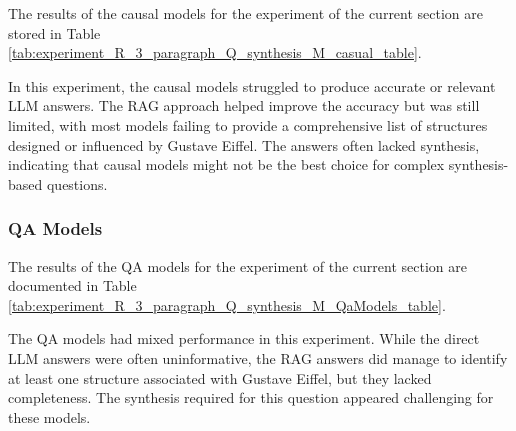 \documentclass{wseas}
\begin{document}
The results of the causal models for the experiment of the current section
are stored in Table \ref{tab:experiment_R_3_paragraph_Q_synthesis_M_casual_table}.

In this experiment, the causal models struggled to produce accurate or
relevant LLM answers. The RAG approach helped improve the accuracy but
was still limited, with most models failing to provide a comprehensive
list of structures designed or influenced by Gustave Eiffel. The answers
often lacked synthesis, indicating that causal models might not be the
best choice for complex synthesis-based questions.


\subsubsection{QA Models}


The results of the QA models for the experiment of the current section
are documented in Table \ref{tab:experiment_R_3_paragraph_Q_synthesis_M_QaModels_table}.

The QA models had mixed performance in this experiment. While the direct
LLM answers were often uninformative, the RAG answers did manage to
identify at least one structure associated with Gustave Eiffel, but they
lacked completeness. The synthesis required for this question appeared
challenging for these models.
\end{document}
